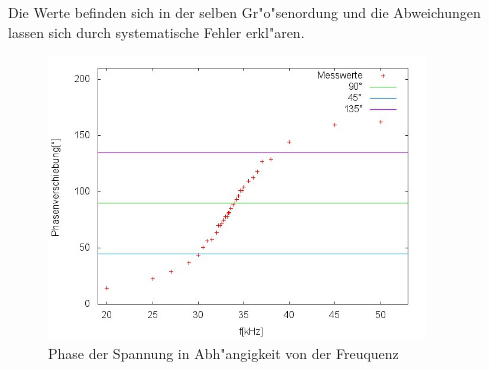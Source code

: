 	Die Werte befinden sich in der selben Gr"o"senordung und die Abweichungen lassen sich durch systematische Fehler erkl"aren.

\clearpage
	\begin{figure}[!h]
		\centering
		\includegraphics[width = 10cm]{img/graph_d.jpg}
		\caption{Phase der Spannung in Abh"angigkeit von der Freuquenz}
		\label{phase}
	\end{figure}

	

	\newpage